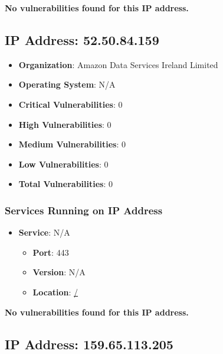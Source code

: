 \documentclass{article}
\begin{document}
\textbf{No vulnerabilities found for this IP address.}




\clearpage



\subsection{IP Address: 52.50.84.159}

\begin{itemize}
    \item \textbf{Organization}: Amazon Data Services Ireland Limited
    \item \textbf{Operating System}:  N/A 
    \item \textbf{Critical Vulnerabilities}: 0
    \item \textbf{High Vulnerabilities}: 0
    \item \textbf{Medium Vulnerabilities}: 0
    \item \textbf{Low Vulnerabilities}: 0
    \item \textbf{Total Vulnerabilities}: 0
\end{itemize}

\subsubsection*{Services Running on IP Address}

\begin{itemize}
    
        \item \textbf{Service}: N/A
        \begin{itemize}
            \item \textbf{Port}: 443
            \item \textbf{Version}:  N/A 
            \item \textbf{Location}: \href{ / }{ / }
        \end{itemize}
    
\end{itemize}


\textbf{No vulnerabilities found for this IP address.}




\clearpage



\subsection{IP Address: 159.65.113.205}
\end{document}
